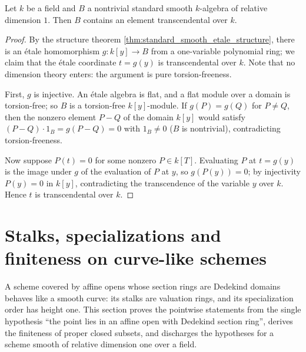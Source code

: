 \begin{theorem}
  \label{thm:standard_smooth_transcendental}
  \leanok
  Let \(k\) be a field and \(B\) a nontrivial standard smooth \(k\)-algebra of relative
  dimension \(1\). Then \(B\) contains an element transcendental over \(k\).
\end{theorem}
\begin{proof}
  \leanok
  By the structure theorem \ref{thm:standard_smooth_etale_structure}, there is an \'etale
  homomorphism \(g : k[y] \to B\) from a one-variable polynomial ring; we claim that the
  \'etale coordinate \(t = g(y)\) is transcendental over \(k\). Note that no dimension
  theory enters: the argument is pure torsion-freeness.

  First, \(g\) is injective. An \'etale algebra is flat, and a flat module over a domain is
  torsion-free; so \(B\) is a torsion-free \(k[y]\)-module. If \(g(P) = g(Q)\) for
  \(P \neq Q\), then the nonzero element \(P - Q\) of the domain \(k[y]\) would satisfy
  \((P - Q) \cdot 1_B = g(P - Q) = 0\) with \(1_B \neq 0\) (\(B\) is nontrivial),
  contradicting torsion-freeness.

  Now suppose \(P(t) = 0\) for some nonzero \(P \in k[T]\). Evaluating \(P\) at \(t = g(y)\)
  is the image under \(g\) of the evaluation of \(P\) at \(y\), so \(g(P(y)) = 0\); by
  injectivity \(P(y) = 0\) in \(k[y]\), contradicting the transcendence of the variable
  \(y\) over \(k\). Hence \(t\) is transcendental over \(k\).
\end{proof}

\section{Stalks, specializations and finiteness on curve-like schemes}

A scheme covered by affine opens whose section rings are Dedekind domains behaves like a
smooth curve: its stalks are valuation rings, and its specialization order has height one.
This section proves the pointwise statements from the single hypothesis ``the point lies in
an affine open with Dedekind section ring'', derives the finiteness of proper closed
subsets, and discharges the hypotheses for a scheme smooth of relative dimension one over a
field.

